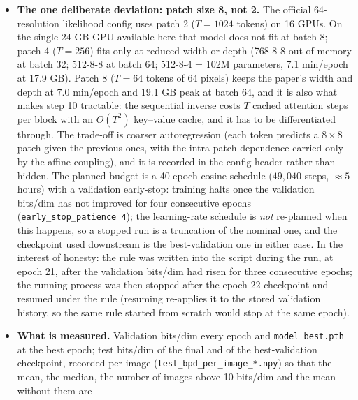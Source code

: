\documentclass[11pt]{article}
\begin{document}
\begin{itemize}
{        8}) because step 10 must push arbitrary latents through the
        \emph{inverse} of this model for thousands of steps and the bound was
        free in bits/dim in step 8.
  \item \textbf{The one deliberate deviation: patch size 8, not 2.} The
        official 64-resolution likelihood config uses patch 2 ($T = 1024$
        tokens) on 16 GPUs. On the single 24 GB GPU available here that
        model does not fit at batch 8; patch 4 ($T = 256$) fits only at
        reduced width or depth (768-8-8 out of memory at batch 32; 512-8-8
        at batch 64; 512-8-4 = 102M parameters, 7.1 min/epoch at 17.9 GB).
        Patch 8 ($T = 64$ tokens of 64 pixels) keeps the paper's width and
        depth at 7.0 min/epoch and 19.1 GB peak at batch 64, and it is also
        what makes step 10 tractable: the sequential inverse costs $T$
        cached attention steps per block with an $O(T^2)$ key--value cache,
        and it has to be differentiated through. The trade-off is coarser
        autoregression (each token predicts a $8 \times 8$ patch given the
        previous ones, with the intra-patch dependence carried only by the
        affine coupling), and it is recorded in the config header rather
        than hidden. The planned budget is a 40-epoch cosine schedule
        ($49{,}040$ steps, $\approx 5$ hours) with a validation early-stop:
        training halts once the validation bits/dim has not improved for
        four consecutive epochs (\texttt{early\_stop\_patience 4}); the
        learning-rate schedule is \emph{not} re-planned when this happens,
        so a stopped run is a truncation of the nominal one, and the
        checkpoint used downstream is the best-validation one in either
        case. In the interest of honesty: the rule was written into the
        script during the run, at epoch 21, after the validation bits/dim
        had risen for three consecutive epochs; the running process was
        then stopped after the epoch-22 checkpoint and resumed under the
        rule (resuming re-applies it to the stored validation history, so
        the same rule started from scratch would stop at the same epoch).
  \item \textbf{What is measured.} Validation bits/dim every epoch and
        \texttt{model\_best.pth} at the best epoch; test bits/dim of the
        final and of the best-validation checkpoint, recorded per image
        (\texttt{test\_bpd\_per\_image\_*.npy}) so that the mean, the median,
        the number of images above 10 bits/dim and the mean without them are

\end{itemize}
\end{document}
